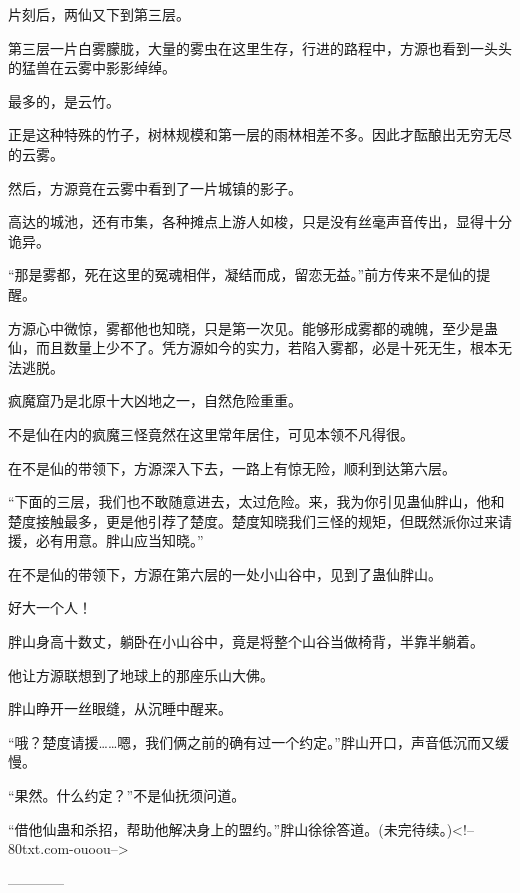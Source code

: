 \begin{this_body}
片刻后，两仙又下到第三层。

第三层一片白雾朦胧，大量的雾虫在这里生存，行进的路程中，方源也看到一头头的猛兽在云雾中影影绰绰。

最多的，是云竹。

正是这种特殊的竹子，树林规模和第一层的雨林相差不多。因此才酝酿出无穷无尽的云雾。

然后，方源竟在云雾中看到了一片城镇的影子。

高达的城池，还有市集，各种摊点上游人如梭，只是没有丝毫声音传出，显得十分诡异。

“那是雾都，死在这里的冤魂相伴，凝结而成，留恋无益。”前方传来不是仙的提醒。

方源心中微惊，雾都他也知晓，只是第一次见。能够形成雾都的魂魄，至少是蛊仙，而且数量上少不了。凭方源如今的实力，若陷入雾都，必是十死无生，根本无法逃脱。

疯魔窟乃是北原十大凶地之一，自然危险重重。

不是仙在内的疯魔三怪竟然在这里常年居住，可见本领不凡得很。

在不是仙的带领下，方源深入下去，一路上有惊无险，顺利到达第六层。

“下面的三层，我们也不敢随意进去，太过危险。来，我为你引见蛊仙胖山，他和楚度接触最多，更是他引荐了楚度。楚度知晓我们三怪的规矩，但既然派你过来请援，必有用意。胖山应当知晓。”

在不是仙的带领下，方源在第六层的一处小山谷中，见到了蛊仙胖山。

好大一个人！

胖山身高十数丈，躺卧在小山谷中，竟是将整个山谷当做椅背，半靠半躺着。

他让方源联想到了地球上的那座乐山大佛。

胖山睁开一丝眼缝，从沉睡中醒来。

“哦？楚度请援……嗯，我们俩之前的确有过一个约定。”胖山开口，声音低沉而又缓慢。

“果然。什么约定？”不是仙抚须问道。

“借他仙蛊和杀招，帮助他解决身上的盟约。”胖山徐徐答道。(未完待续。)<!--80txt.com-ouoou-->

------------

\end{this_body}

